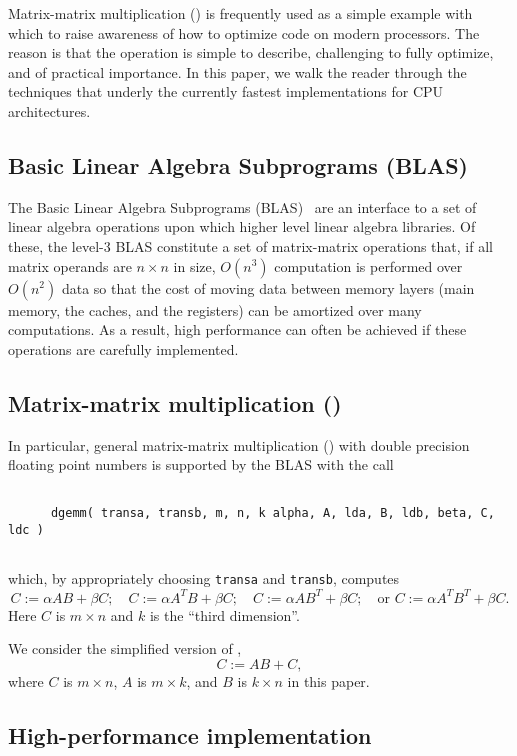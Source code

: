 Matrix-matrix multiplication (\Gemm) is frequently used as a simple example with which to raise awareness of how to optimize code on modern processors.  The reason is that the operation is simple to describe, challenging to fully optimize, and of practical importance.  In this paper, we walk the reader through the techniques that underly the currently fastest implementations for CPU architectures.

\subsection{Basic Linear Algebra Subprograms (BLAS)}

The Basic Linear Algebra Subprograms (BLAS)~\cite{BLAS1,BLAS2,BLAS3,BLIS-Encycl} are an interface to a set of linear algebra operations upon which higher level linear algebra libraries.  Of these, the level-3 BLAS constitute a set of matrix-matrix operations that, if all matrix operands are $ n \times n$ in size, $ O( n^3 ) $ computation is performed over $ O( n^2 ) $ data so that the cost of moving data between memory layers (main memory, the caches, and the registers) can be amortized over many computations.  As a result, high performance can often be achieved if these operations are carefully implemented.

\subsection{Matrix-matrix multiplication (\Gemm)}

In particular, general matrix-matrix multiplication (\Gemm) with double precision floating point numbers is supported by the BLAS with the call
\begin{verbatim}

      dgemm( transa, transb, m, n, k alpha, A, lda, B, ldb, beta, C, ldc )
      
\end{verbatim}
which, by appropriately choosing {\tt transa} and {\tt transb}, 
computes 
\[
C := \alpha A B + \beta C; \quad
C := \alpha A^T B + \beta C; \quad
C := \alpha A B^T + \beta C; \quad \mbox{or }
C := \alpha A^T B^T + \beta C.
\]
Here $ C $ is $ m \times n $ and $ k $ is the ``third dimension''.

We consider the simplified version of \Gemm,
\[
C := A B + C,
\]
where $ C $ is $ m \times n $, 
$ A $ is $ m \times k $, and $ B $ is $ k \times n $
in this paper.


\subsection{High-performance implementation}

